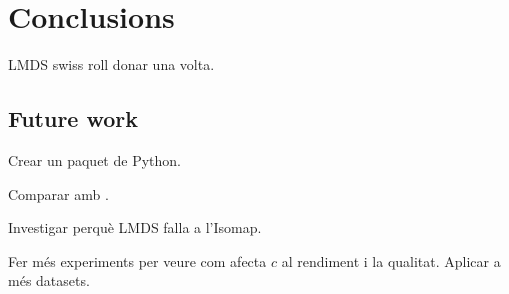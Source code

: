 \section{Conclusions}

LMDS swiss roll donar una volta.


\subsection{Future work}

Crear un paquet de Python.

Comparar amb \citet{Reichmann2024}.

Investigar perquè LMDS falla a l'Isomap.

Fer més experiments per veure com afecta $c$ al rendiment i la qualitat. Aplicar a més datasets.
